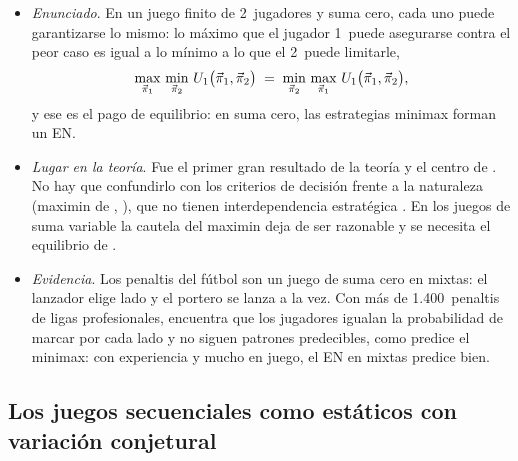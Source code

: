 \documentclass[11pt]{article}
\begin{document}
\begin{itemize}
\item \emph{Enunciado}\nocite{VonNeumann1928Theorie}. En un juego finito de 2~jugadores y suma cero, cada uno puede garantizarse lo mismo: lo máximo que el jugador 1~puede asegurarse contra el peor caso es igual a lo mínimo a lo que el 2~puede limitarle,
\[
\max_{\vec{\pi}_1}\,\min_{\vec{\pi}_2}\,U_1\big(\vec{\pi}_1,\vec{\pi}_2\big)\;=\;\min_{\vec{\pi}_2}\,\max_{\vec{\pi}_1}\,U_1\big(\vec{\pi}_1,\vec{\pi}_2\big),
\]
  y ese  es el pago de equilibrio: en suma cero, las estrategias minimax forman un EN.
\item \emph{Lugar en la teoría}. Fue el primer gran resultado de la teoría y el centro de \textcite{VonNeumannMorgenstern1944Theory}. No hay que confundirlo con los criterios de decisión frente a la naturaleza (maximin de , ), que no tienen interdependencia estratégica . En los juegos de suma variable la cautela del maximin deja de ser razonable y se necesita el equilibrio de .
\item \emph{Evidencia}. Los penaltis del fútbol son un juego de suma cero en mixtas: el lanzador elige lado y el portero se lanza a la vez. Con más de 1.400~penaltis de ligas profesionales, \textcite{PalaciosHuerta2003Professionals} encuentra que los jugadores igualan la probabilidad de marcar por cada lado y no siguen patrones predecibles, como predice el minimax: con experiencia y mucho en juego, el EN en mixtas predice bien.
\end{itemize}

\subsection*{Los juegos secuenciales como estáticos con variación conjetural}
\end{document}
